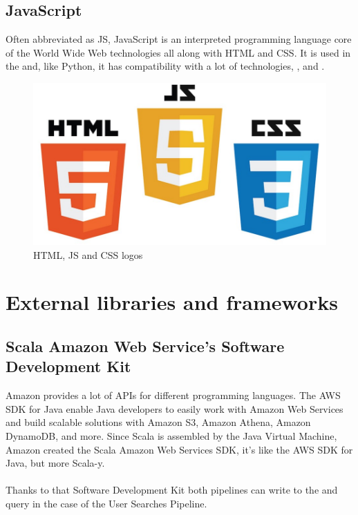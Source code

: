 \subsection*{JavaScript\cite{js}}

Often abbreviated as JS, JavaScript is an interpreted programming language core of the World Wide Web technologies all along with HTML\cite{html} and CSS\cite{css}. It is used in the  and, like Python, it has compatibility with a lot of technologies, ,  and .

\begin{figure}[H]
\centering
\includegraphics[scale=0.1]{resources/www-tech-logos.jpeg}
\caption{HTML, JS and CSS logos}
\end{figure}

\section{External libraries and frameworks}

\subsection*{Scala Amazon Web Service's Software Development Kit\cite{scala_aws}} \label{scala_aws}

Amazon provides a lot of APIs for different programming languages. The AWS SDK for Java enable Java developers to easily work with Amazon Web Services and build scalable solutions with Amazon S3, Amazon Athena, Amazon DynamoDB, and more. Since Scala is assembled by the Java Virtual Machine, Amazon created the Scala Amazon Web Services SDK, it's like the AWS SDK for Java, but more Scala-y.
\\\\
Thanks to that Software Development Kit both pipelines can write to the  and query  in the case of the User Searches Pipeline.

